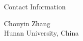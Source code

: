 \documentclass[
 size=14pt,
 paper=smartboard,  %
 mode=present, 		%
 display=slides, 	%
 style=tuliplab,  	%
 pauseslide,
 fleqn,leqno]{powerdot}
\begin{document}
%

\begin{wideslide}[toc=,bm=]{Contact Information}
\centering
{}
\twocolumn[
lcolwidth=0.35\linewidth,
rcolwidth=0.65\linewidth
]
{
}
{
Chouyin Zhang\\
Hunan University, China

}
\end{wideslide}
\end{document}
